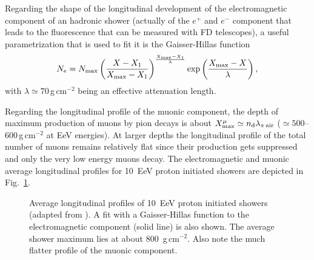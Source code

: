 \documentclass[twoside,12pt]{article}
\newcommand{\be}{\begin{equation}}
\newcommand{\ee}{\end{equation}}
\begin{document}
Regarding the shape of the longitudinal development of the electromagnetic component of an hadronic shower (actually of the $e^+$ and $e^-$ component that leads to the fluorescence that can be measured with FD telescopes), a useful parametrization that is used to fit it is the Gaisser-Hillas function
\be 
N_{e}=N_{\rm max}\left(\frac{X-X_1}{X_{\rm max}-X_1}\right)^{\frac{X_{\rm max}-X_1}{\lambda}}\exp\left(\frac{X_{\rm max}-X}{\lambda}\right),
\ee 
with $\lambda\simeq 70$\,g\,cm$^{-2}$ being an effective attenuation length. 

Regarding the longitudinal profile of the muonic component, the depth of  maximum production of muons by pion decays is about $X_{\rm max}^\mu\simeq n_{\rm d}\lambda_{\pi\,{\rm air}}$ ($\simeq 500$--600\,g\,cm$^{-2}$ at EeV energies).  At larger depths the longitudinal profile of the total number of muons remains relatively flat since their production gets suppressed and only the very low energy muons decay. The electromagnetic and muonic average longitudinal profiles for 10~EeV proton initiated showers are depicted in Fig.~\ref{longprof}.

\begin{figure}[tb]
\begin{center}
\begin{minipage}[t]{8 cm}
\centerline{}
\end{minipage}
\caption{Average longitudinal profiles of 10~EeV proton initiated showers (adapted from \cite{augerweather}). A fit with a Gaisser-Hillas function to the electromagnetic component (solid line) is also shown. The average shower maximum lies at about 800~g\,cm$^{-2}$. Also note the much flatter profile of the muonic component.
 \label{longprof}}
\end{center}
\end{figure}
\end{document}

